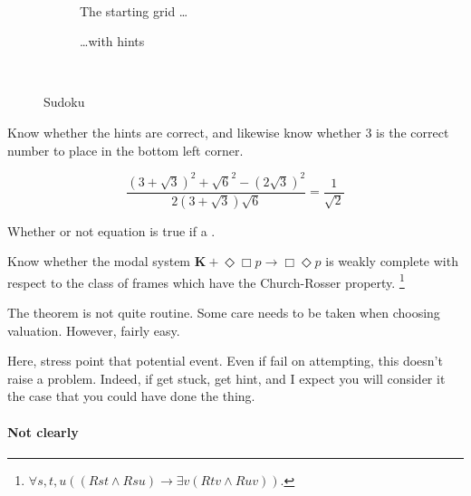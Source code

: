 \begin{note}
  \begin{illustration}[Sudoku]
    \label{illu:gist:sudoku}
    \begin{figure}[H]
      \mbox{ }\hfill
      \begin{subfigure}{0.45\linewidth}
        \centering
        \sudokuGrid{}
        \caption{The starting grid \dots}
        \label{fig:sudoku:grid}
      \end{subfigure}
      \hfill
      \begin{subfigure}{0.45\linewidth}
        \centering
        \sudokuGridHints{}
        \caption{\dots with hints}
        \label{fig:sudoku:hint}
      \end{subfigure}
      \hfill\mbox{ }
      \caption{Sudoku}
      \label{fig:sudoku}
    \end{figure}
    Know whether the hints are correct, and likewise know whether 3 is the correct number to place in the bottom left corner.
  \end{illustration}
\end{note}

\begin{note}
  \[\frac{(3 + \sqrt{3})^{2} + \sqrt{6}^{2} - (2\sqrt{3})^{2}}{2(3 + \sqrt{3})\sqrt{6}} = \frac{1}{\sqrt{2}}\]

  Whether or not equation is true if a \fc{}.
\end{note}

\begin{note}
  \begin{illustration}
    Know whether the modal system \(\mathbf{K} + \Diamond\Box p \rightarrow \Box\Diamond p\) is weakly complete with respect to the class of frames which have the Church-Rosser property.%
    \footnote{ \(\forall s,t,u((Rst \land Rsu) \rightarrow \exists v(Rtv \land Ruv))\). }
  \end{illustration}

  The theorem is not quite routine.
  Some care needs to be taken when choosing valuation.
  However, fairly easy.

  Here, stress point that potential event.
  Even if fail on attempting, this doesn't raise a problem.
  Indeed, if get stuck, get hint, and I expect you will consider it the case that you could have done the thing.
\end{note}

\paragraph{Not clearly }

